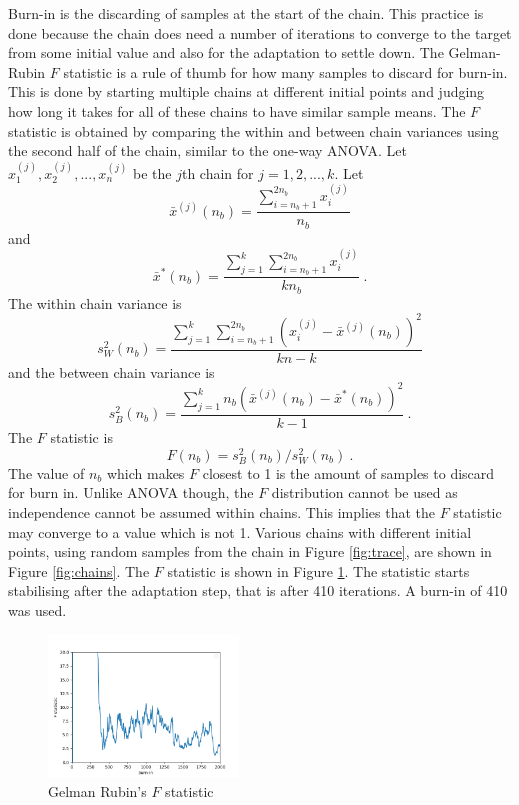\documentclass[10pt]{proc}
\newcommand{\dotdotdot}{...}
\begin{document}
Burn-in \citep{geyer1992practical} \citep{geyer2011mcmc} is the discarding of samples at the start of the chain. This practice is done because the chain does need a number of iterations to converge to the target from some initial value and also for the adaptation to settle down. The Gelman-Rubin $F$ statistic \citep{gelman1992inference} is a rule of thumb for how many samples to discard for burn-in. This is done by starting multiple chains at different initial points and judging how long it takes for all of these chains to have similar sample means. The $F$ statistic is obtained by comparing the within and between chain variances using the second half of the chain, similar to the one-way ANOVA. Let $x_1^{(j)}, x_2^{(j)},\dotdotdot,x_n^{(j)}$ be the $j$th chain for $j=1,2,\dotdotdot,k$. Let
\begin{equation}
\bar{x}^{(j)}(n_b)=\dfrac{\sum_{i=n_b+1}^{2n_b}x_i^{(j)}}{n_b}
\end{equation}
and
\begin{equation}
\bar{x}^*(n_b) = \dfrac{\sum_{j=1}^k\sum_{i=n_b+1}^{2n_b}x_i^{(j)}}{kn_b}
\ .
\end{equation}
The within chain variance is
\begin{equation}
s_W^2(n_b) = \dfrac{
  \sum_{j=1}^k \sum_{i=n_b+1}^{2n_b} \left(
    x_i^{(j)} - \bar{x}^{(j)}(n_b)
  \right)^2
}
{
  kn - k
}
\end{equation}
and the between chain variance is
\begin{equation}
s_B^2(n_b) = \dfrac{
  \sum_{j=1}^k  n_b \left(
    \bar{x}^{(j)}(n_b) - \bar{x}^*(n_b)
  \right)^2
}
{
  k-1
}
\ .
\end{equation}
The $F$ statistic is
\begin{equation}
F(n_b) = s_B^2(n_b) / s_W^2(n_b) \ .
\end{equation}
The value of $n_b$ which makes $F$ closest to 1 is the amount of samples to discard for burn in. Unlike ANOVA though, the $F$ distribution cannot be used as independence cannot be assumed within chains. This implies that the $F$ statistic may converge to a value which is not 1. Various chains with different initial points, using random samples from the chain in Figure \ref{fig:trace}, are shown in Figure \ref{fig:chains}. The $F$ statistic is shown in Figure \ref{fig:grs}.  The statistic starts stabilising after the adaptation step, that is after 410 iterations. A burn-in of 410 was used.

\begin{figure}[ht]
  \centering
  \includegraphics[width=0.45\textwidth]{f.png}
  \caption{Gelman Rubin's $F$ statistic}
  \label{fig:grs}
\end{figure}
\end{document}
